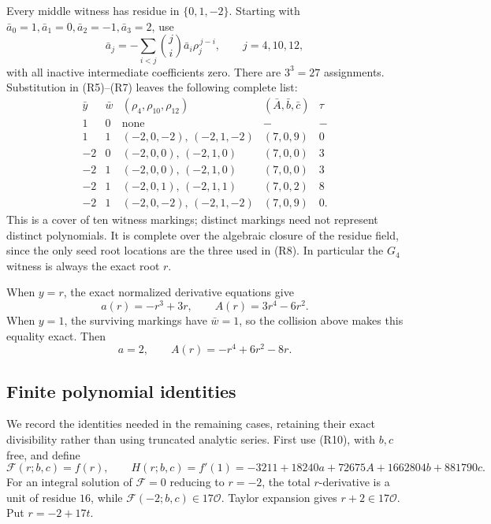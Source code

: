 \documentclass[
  british,
  10pt,
  a4paper,
]{article}
\newcounter{none} %
\begin{document}
Every middle witness has residue in \(\{0,1,-2\}\). Starting with
\(\bar a_0=1,\bar a_1=0,\bar a_2=-1,\bar a_3=2\), use \[
\bar a_j=-\sum_{i<j}\binom ji\bar a_i\rho_j^{\,j-i},
\qquad j=4,10,12,                                             \tag{R8}
\] with all inactive intermediate coefficients zero. There are
\(3^3=27\) assignments. Substitution in (R5)--(R7) leaves the following
complete list: \[
\begin{array}{c|c|c|c|c}
\bar y&\bar w&(\rho_4,\rho_{10},\rho_{12})
 &(\bar A,\bar b,\bar c)&\tau\\ \hline
1&0&\text{none}&-&-\\
1&1&(-2,0,-2),\,(-2,1,-2)&(7,0,9)&0\\
-2&0&(-2,0,0),\,(-2,1,0)&(7,0,0)&3\\
-2&1&(-2,0,0),\,(-2,1,0)&(7,0,0)&3\\
-2&1&(-2,0,1),\,(-2,1,1)&(7,0,2)&8\\
-2&1&(-2,0,-2),\,(-2,1,-2)&(7,0,9)&0.
\end{array}                                                   \tag{R9}
\] This is a cover of ten witness markings; distinct markings need not
represent distinct polynomials. It is complete over the algebraic
closure of the residue field, since the only seed root locations are the
three used in (R8). In particular the \(G_4\) witness is always the
exact root \(r\).

When \(y=r\), the exact normalized derivative equations give \[
a(r)=-r^3+3r,\qquad A(r)=3r^4-6r^2.                           \tag{R10}
\] When \(y=1\), the surviving markings have \(\bar w=1\), so the
collision above makes this equality exact. Then \[
a=2,\qquad A(r)=-r^4+6r^2-8r.                                \tag{R11}
\]

\subsection{Finite polynomial
identities}\label{finite-polynomial-identities}

We record the identities needed in the remaining cases, retaining their
exact divisibility rather than using truncated analytic series. First
use (R10), with \(b,c\) free, and define \[
\mathcal F(r;b,c)=f(r),\qquad
H(r;b,c)=f'(1)
=-3211+18240a+72675A+1662804b+881790c.
\] For an integral solution of \(\mathcal F=0\) reducing to \(r=-2\),
the total \(r\)-derivative is a unit of residue \(16\), while
\(\mathcal F(-2;b,c)\in17\mathcal O\). Taylor expansion gives
\(r+2\in17\mathcal O\). Put \(r=-2+17t\).
\end{document}
